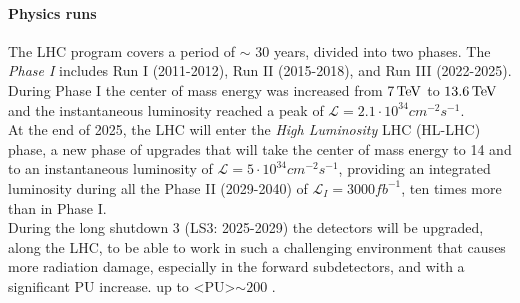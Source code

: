 \paragraph*{Physics runs}
The LHC program covers a period of $\sim$ 30 years, divided into two phases. 
The \emph{Phase I} includes Run I (2011-2012), Run II (2015-2018), and Run III (2022-2025).
During Phase I the center of mass energy was increased from $7 {\,\text{Te\hspace{-.08em}V}}$ to $13.6 {\,\text{Te\hspace{-.08em}V}}$ and the instantaneous luminosity reached a peak of $\mathcal{L}= 2.1 \cdot 10^{34}cm^{-2} s^{-1}$. \\
At the end of 2025, the LHC will enter the \emph{High Luminosity} LHC (HL-LHC) phase, a new phase of upgrades that will take the center of mass energy to 14 \TeV and to an instantaneous luminosity of $\mathcal{L}=5 \cdot 10^{34}cm^{-2} s^{-1}$, providing an integrated luminosity during all the Phase II (2029-2040) of $\mathcal{L}_I=3000 fb^{-1}$, ten times more than in Phase I.\\
During the long shutdown 3 (LS3: 2025-2029) the detectors will be upgraded, along the LHC, to be able to work in such a challenging environment that causes more radiation damage, especially in the forward subdetectors, and with a significant PU increase. up to <PU>$\sim 200$ \cite{Aberle2020SubmitterReport}. 

